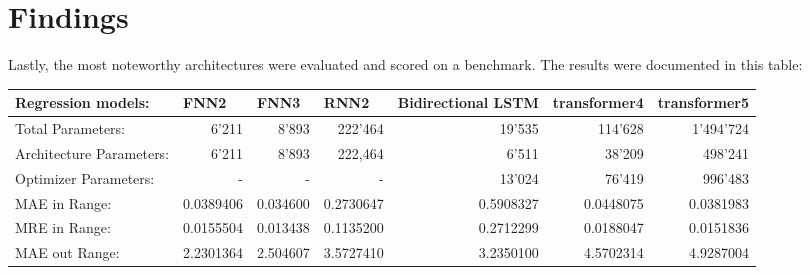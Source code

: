 \documentclass{article}
\begin{document}
\section{Findings}
Lastly, the most noteworthy architectures were evaluated and scored on a benchmark. The results were documented in this table: 
\\[0.5em]
\begin{table}[htbp]
\centering
\footnotesize
\begin{tabular}{|lr|r|r|r|r|r|r|}
\hline
\multicolumn{2}{|l|}{Regression models:}                              & \multicolumn{1}{l|}{FNN2} & \multicolumn{1}{l|}{FNN3}        & \multicolumn{1}{l|}{RNN2} & \multicolumn{1}{l|}{Bidirectional   LSTM} & \multicolumn{1}{l|}{transformer4} & \multicolumn{1}{l|}{transformer5} \\ \hline
\multicolumn{2}{|l|}{Total   Parameters:}                             & 6’211                     & 8’893                            & 222’464                   & 19’535                                    & 114’628                           & 1’494’724                         \\
\multicolumn{2}{|l|}{Architecture   Parameters:}                      & 6’211                     & 8’893                            & 222,464                   & 6’511                                     & 38’209                            & 498’241                           \\
\multicolumn{2}{|l|}{Optimizer   Parameters:}                         & -                         & -                                & -                         & 13’024                                    & 76’419                            & 996’483                           \\
\rowcolor[HTML]{F7C7AC} 
MAE in Range:                              &                          & 0.0389406                 & 0.034600                         & 0.2730647                 & 0.5908327                                 & 0.0448075                         & 0.0381983                         \\
\rowcolor[HTML]{F7C7AC} 
MRE in Range:                              &                          & 0.0155504                 & 0.013438                         & 0.1135200                 & 0.2712299                                 & 0.0188047                         & 0.0151836                         \\
\rowcolor[HTML]{94DCF8} 
MAE out Range:                             &                          & 2.2301364                 & \cellcolor[HTML]{83CCEB}2.504607 & 3.5727410                 & 3.2350100                                 & 4.5702314                         & 4.9287004                         \\

\end{tabular}
\end{table}
\end{document}
